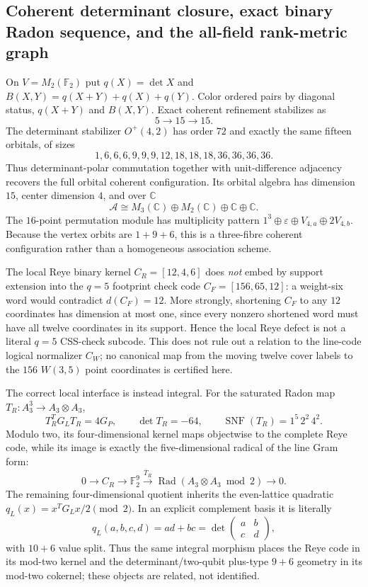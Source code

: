 \subsection*{Coherent determinant closure, exact binary Radon sequence, and the all-field rank-metric graph}

On $V=M_2(\mathbb F_2)$ put $q(X)=\det X$ and
$B(X,Y)=q(X+Y)+q(X)+q(Y)$.  Color ordered pairs by diagonal status,
$q(X+Y)$ and $B(X,Y)$.  Exact coherent refinement stabilizes as
\[
 \boxed{5\longrightarrow15\longrightarrow15}.
\]
The determinant stabilizer $O^+(4,2)$ has order $72$ and exactly the same
fifteen orbitals, of sizes
\[
1,6,6,6,9,9,9,12,18,18,18,36,36,36,36.
\]
Thus determinant-polar commutation together with unit-difference adjacency
recovers the full orbital coherent configuration.  Its orbital algebra has
dimension $15$, center dimension $4$, and over $\mathbb C$
\[
 \boxed{\mathcal A\cong M_3(\mathbb C)\oplus M_2(\mathbb C)\oplus\mathbb C\oplus\mathbb C}.
\]
The $16$-point permutation module has multiplicity pattern
$1^3\oplus\varepsilon\oplus V_{4,a}\oplus2V_{4,b}$.  Because the vertex
orbits are $1+9+6$, this is a three-fibre coherent configuration rather than a
homogeneous association scheme.

The local Reye binary kernel $C_R=[12,4,6]$ does \emph{not} embed by support
extension into the $q=5$ footprint check code $C_F=[156,65,12]$: a weight-six
word would contradict $d(C_F)=12$.  More strongly, shortening $C_F$ to any
$12$ coordinates has dimension at most one, since every nonzero shortened word
must have all twelve coordinates in its support.  Hence the local Reye defect is
not a literal $q=5$ CSS-check subcode.  This does not rule out a relation to the
line-code logical normalizer $C_W$; no canonical map from the moving twelve
cover labels to the $156$ $W(3,5)$ point coordinates is certified here.

The correct local interface is instead integral.  For the saturated Radon map
$T_R:A_3^3\to A_3\otimes A_3$,
\[
 \boxed{T_R^TG_LT_R=4G_P},\qquad
 \det T_R=-64,
 \qquad
 \operatorname{SNF}(T_R)=1^5\,2^2\,4^2.
\]
Modulo two, its four-dimensional kernel maps objectwise to the complete Reye
code, while its image is exactly the five-dimensional radical of the line Gram
form:
\[
 \boxed{0\to C_R\to\mathbb F_2^9\xrightarrow{\bar T_R}
 \operatorname{Rad}(A_3\otimes A_3\bmod2)\to0}.
\]
The remaining four-dimensional quotient inherits the even-lattice quadratic
$q_L(x)=x^TG_Lx/2\pmod2$.  In an explicit complement basis it is literally
\[
 \boxed{q_L(a,b,c,d)=ad+bc=\det\!\begin{pmatrix}a&b\\c&d\end{pmatrix}},
\]
with $10+6$ value split.  Thus the same integral morphism places the Reye code
in its mod-two kernel and the determinant/two-qubit plus-type $9+6$ geometry in
its mod-two cokernel; these objects are related, not identified.

